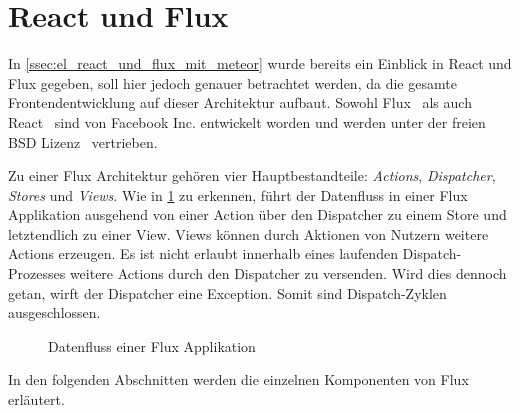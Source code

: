 \section{React und Flux}
\label{sec:g_react_und_flux}

In \cref{ssec:el_react_und_flux_mit_meteor} wurde bereits ein Einblick in React
und Flux gegeben, soll hier jedoch genauer betrachtet werden, da die gesamte
Frontendentwicklung auf dieser Architektur aufbaut.  Sowohl Flux~\cite{flux} als
auch React~\cite{react} sind von Facebook Inc. entwickelt worden und werden
unter der freien BSD Lizenz~\cite{bsd} vertrieben.

Zu einer Flux Architektur gehören vier Hauptbestandteile:
\emph{Actions}, \emph{Dispatcher},
\emph{Stores} und \emph{Views}.  Wie in
\cref{fig:flux_data_flow} zu erkennen, führt der Datenfluss in einer Flux
Applikation ausgehend von einer Action über den Dispatcher zu einem Store und
letztendlich zu einer View.  Views können durch Aktionen von Nutzern weitere
Actions erzeugen.  Es ist nicht erlaubt innerhalb eines laufenden
Dispatch-Prozesses weitere Actions durch den Dispatcher zu versenden.  Wird dies
dennoch getan, wirft der Dispatcher eine Exception.  Somit sind Dispatch-Zyklen
ausgeschlossen.

\begin{figure}
    \centering
    
    \caption{Datenfluss einer Flux Applikation}
    \label{fig:flux_data_flow}
\end{figure}

In den folgenden Abschnitten werden die einzelnen Komponenten von Flux
erläutert.






